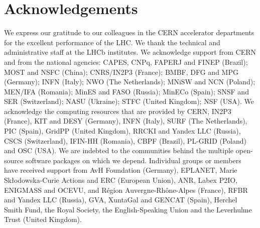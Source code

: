 \section*{Acknowledgements}
%
%
\noindent We express our gratitude to our colleagues in the CERN
accelerator departments for the excellent performance of the LHC. We
thank the technical and administrative staff at the LHCb
institutes. We acknowledge support from CERN and from the national
agencies: CAPES, CNPq, FAPERJ and FINEP (Brazil); MOST and NSFC
(China); CNRS/IN2P3 (France); BMBF, DFG and MPG (Germany); INFN
(Italy); NWO (The Netherlands); MNiSW and NCN (Poland); MEN/IFA
(Romania); MinES and FASO (Russia); MinECo (Spain); SNSF and SER
(Switzerland); NASU (Ukraine); STFC (United Kingdom); NSF (USA).  We
acknowledge the computing resources that are provided by CERN, IN2P3
(France), KIT and DESY (Germany), INFN (Italy), SURF (The
Netherlands), PIC (Spain), GridPP (United Kingdom), RRCKI and Yandex
LLC (Russia), CSCS (Switzerland), IFIN-HH (Romania), CBPF (Brazil),
PL-GRID (Poland) and OSC (USA). We are indebted to the communities
behind the multiple open-source software packages on which we depend.
Individual groups or members have received support from AvH Foundation
(Germany), EPLANET, Marie Sk\l{}odowska-Curie Actions and ERC
(European Union), ANR, Labex P2IO, ENIGMASS and OCEVU, and R\'{e}gion
Auvergne-Rh\^{o}ne-Alpes (France), RFBR and Yandex LLC (Russia), GVA,
XuntaGal and GENCAT (Spain), Herchel Smith Fund, the Royal Society,
the English-Speaking Union and the Leverhulme Trust (United Kingdom).

